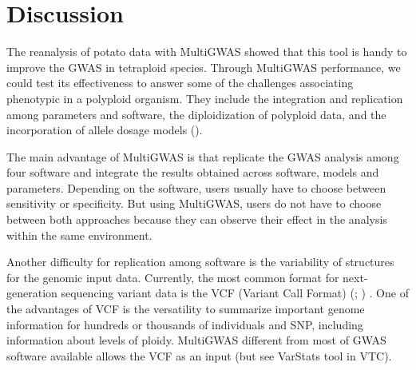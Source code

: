 \section{Discussion}


The reanalysis of potato data with MultiGWAS showed that this tool is handy to improve the GWAS in tetraploid species. Through MultiGWAS performance, we could test its effectiveness to answer some of the challenges associating phenotypic in a polyploid organism. They include the integration and replication among parameters and software, the diploidization of polyploid data, and the incorporation of allele dosage models (\cite{dufresne2014}). 

The main advantage of MultiGWAS is that replicate the GWAS analysis among four software and integrate the results obtained across software, models and parameters. Depending on the software, users usually have to choose between sensitivity or specificity. But using MultiGWAS, users do not have to choose between both approaches because they can observe their effect in the analysis within the same environment.  

Another difficulty for replication among software is the variability of structures for the genomic input data. Currently, the most common format for next-generation sequencing variant data is the VCF (Variant Call Format) (\cite{Danecek2011}; \cite{Ebbert2014}) . One of the advantages of VCF is the versatility to summarize important genome information for hundreds or thousands of individuals and SNP, including information about levels of ploidy. MultiGWAS different from most of GWAS software available allows the VCF as an input (but see VarStats tool in VTC).  


